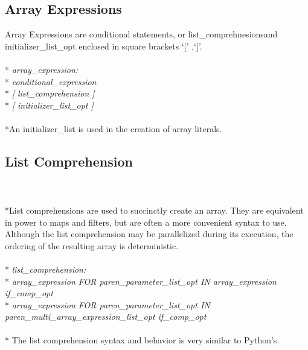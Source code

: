 \documentclass[11pt]{article}
\newcommand{\tab}{\hspace*{2em}}
\begin{document}
\subsection{Array Expressions}
Array Expressions are conditional statements, or list\_comprehnesionsand initializer\_list\_opt enclosed in square brackets `[' ,`]'.
\\ \\* \tab \emph{array\_expression:}
\\* \tab \tab \emph{conditional\_expression}
\\* \tab \tab \emph{[ list\_comprehension ]}
\\* \tab \tab \emph{[ initializer\_list\_opt ]}
\\ \\*An initializer\_list is used in the creation of array literals.
\subsection{List Comprehension}
\\ \\*List comprehensions are used to succinctly create an array. They are equivalent in power to maps and filters, but are often a more convenient syntax to use. Although the list comprehension may be parallelized during its execution, the ordering of the resulting array is deterministic.
\\ \\* \tab \emph{list\_comprehension:}
\\* \tab \tab \emph{array\_expression FOR paren\_parameter\_list\_opt IN array\_expression if\_comp\_opt}
\\* \tab \tab \emph{array\_expression FOR paren\_parameter\_list\_opt IN                               paren\_multi\_array\_expression\_list\_opt if\_comp\_opt}
\\ \\* The list comprehension syntax and behavior is very similar to Python's.
\end{document}
